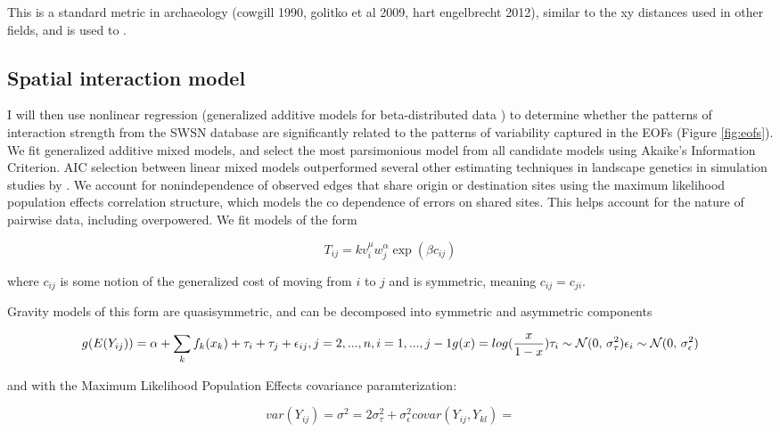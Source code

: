 \documentclass[fleqn,10pt]{wlscirep}
\begin{document}
This is a standard metric in archaeology (cowgill 1990, golitko et al 2009, hart engelbrecht 2012), similar to the xy distances used in other fields, and is used to .




\subsection*{Spatial interaction model}
I will then use nonlinear regression (generalized additive models for beta-distributed data \cite{Wood2006a}) to determine whether the patterns of interaction strength from the SWSN database are significantly related to the patterns of variability captured in the EOFs (Figure \ref{fig:eofs}).
We fit generalized additive mixed models, and select the most parsimonious model from all candidate models using Akaike's Information Criterion. AIC selection between linear mixed models outperformed several other estimating techniques in landscape genetics in simulation studies by \cite{Shirk et al 2018}. We account for nonindependence of observed edges that share origin or destination sites using the maximum likelihood population effects correlation structure, which models the co dependence of errors on shared sites. This helps account for the nature of pairwise data, including overpowered.
We fit models of the form

$$T_{ij} = k v_i^\mu w_j^\alpha \exp(\beta c_{ij})$$

where $c_{ij}$ is some notion of the generalized cost of moving from $i$ to $j$ and is symmetric, meaning $c_{ij} = c_{ji}$.

Gravity models of this form are quasisymmetric, and can be decomposed into symmetric and asymmetric components

\begin{equation}
    g(E(Y_{ij})) = \alpha + \sum_k f_k(x_k) + \tau_i + \tau_j + \epsilon_{ij}, j = 2, ..., n, i = 1, ..., j - 1\\
    g(x) = log(\frac{x}{1-x})\\
    \tau_i \sim \mathcal{N}(0,\,\sigma^{2}_{\tau})\\
    \epsilon_i \sim \mathcal{N}(0,\,\sigma^{2}_{\epsilon})
\end{equation}

and with the Maximum Likelihood Population Effects covariance paramterization:

\begin{equation}
    var(Y_{ij}) = \sigma^2 = 2\sigma^{2}_{\tau} + \sigma^{2}_{\epsilon}
    covar(Y_{ij}, Y_{kl}) =  
\end{equation}
\end{document}
